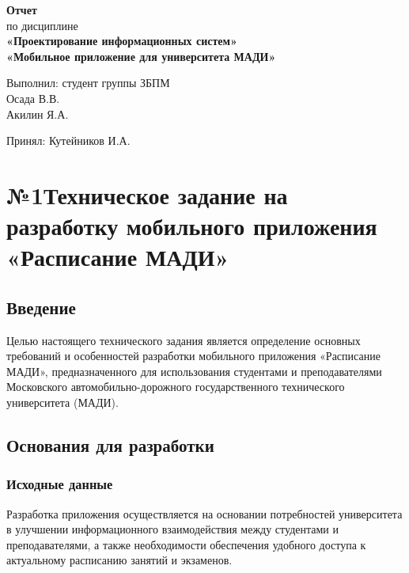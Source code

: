 \documentclass[a4paper,12pt]{article}
\begin{document}
\vspace{4cm}



\vspace{5cm}

\begin{center}
\Large \textbf{Отчет}\\
по дисциплине\\
\textbf{«Проектирование информационных систем»}\\
\textbf{«Мобильное приложение для университета МАДИ»}
\end{center}

\vspace{3cm}

\begin{flushright}
Выполнил: студент группы ЗБПМ\\
Осада В.В.\\
Акилин Я.А.\\
\end{flushright}
\begin{flushright}
Принял: Кутейников И.А.
\end{flushright}

\newpage

\section{№1Техническое задание
    на разработку мобильного приложения
    «Расписание МАДИ»}
\subsection*{Введение}
Целью настоящего технического задания является определение основных требований и особенностей разработки мобильного приложения «Расписание МАДИ», предназначенного для использования студентами и преподавателями Московского автомобильно-дорожного государственного технического университета (МАДИ).

\subsection{Основания для разработки}
\subsubsection{Исходные данные}
Разработка приложения осуществляется на основании потребностей университета в улучшении информационного взаимодействия между студентами и преподавателями, а также необходимости обеспечения удобного доступа к актуальному расписанию занятий и экзаменов.
\end{document}
